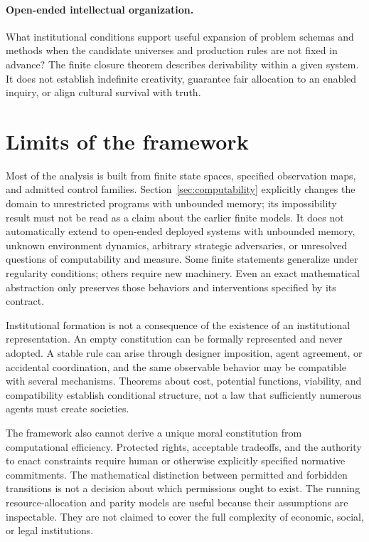 \documentclass[11pt,letterpaper]{article}
\theoremstyle{plain}
\theoremstyle{definition}
\theoremstyle{remark}
\begin{document}
\paragraph{Open-ended intellectual organization.}
What institutional conditions support useful expansion of problem schemas and methods when the candidate universes and production rules are not fixed in advance? The finite closure theorem describes derivability within a given system. It does not establish indefinite creativity, guarantee fair allocation to an enabled inquiry, or align cultural survival with truth.

\section{Limits of the framework}\label{sec:limits}

Most of the analysis is built from finite state spaces, specified observation maps, and admitted control families. Section~\ref{sec:computability} explicitly changes the domain to unrestricted programs with unbounded memory; its impossibility result must not be read as a claim about the earlier finite models. It does not automatically extend to open-ended deployed systems with unbounded memory, unknown environment dynamics, arbitrary strategic adversaries, or unresolved questions of computability and measure. Some finite statements generalize under regularity conditions; others require new machinery. Even an exact mathematical abstraction only preserves those behaviors and interventions specified by its contract.

Institutional formation is not a consequence of the existence of an institutional representation. An empty constitution can be formally represented and never adopted. A stable rule can arise through designer imposition, agent agreement, or accidental coordination, and the same observable behavior may be compatible with several mechanisms. Theorems about cost, potential functions, viability, and compatibility establish conditional structure, not a law that sufficiently numerous agents must create societies.

The framework also cannot derive a unique moral constitution from computational efficiency. Protected rights, acceptable tradeoffs, and the authority to enact constraints require human or otherwise explicitly specified normative commitments. The mathematical distinction between permitted and forbidden transitions is not a decision about which permissions ought to exist. The running resource-allocation and parity models are useful because their assumptions are inspectable. They are not claimed to cover the full complexity of economic, social, or legal institutions.
\end{document}
